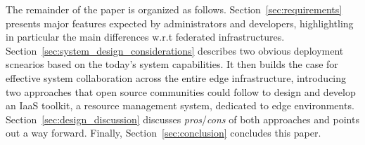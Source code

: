 
The remainder of the paper is organized as
follows. Section~\ref{sec:requirements} presents major features
expected by administrators and developers, highlightling in particular
the main differences w.r.t federated infrastructures.
Section~\ref{sec:system_design_considerations} describes two obvious deployment scnearios based on the today's system capabilities. It then builds the case for effective system collaboration across the entire edge infrastructure, introducing two approaches that 
open source communities could follow to design and develop an IaaS
toolkit, \aka a resource management system, dedicated to edge
environments. Section~\ref{sec:design_discussion} discusses \emph{pros}/\emph{cons}
of both approaches and points out a way forward. Finally,
Section~\ref{sec:conclusion} concludes this paper.



